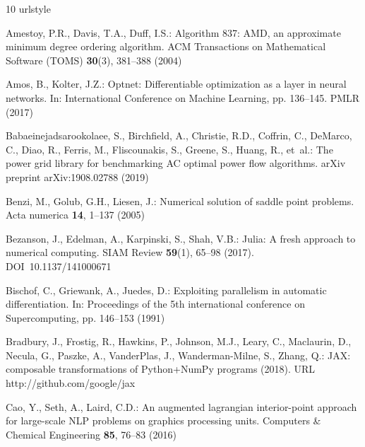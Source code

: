 \documentclass[smallextended]{svjour3}
\begin{document}
\small

\begin{thebibliography}{10}
\providecommand{\url}[1]{{#1}}
\providecommand{\urlprefix}{URL }
\expandafter\ifx\csname urlstyle\endcsname\relax
  \providecommand{\doi}[1]{DOI~\discretionary{}{}{}#1}\else
  \providecommand{\doi}{DOI~\discretionary{}{}{}\begingroup \urlstyle{rm}\Url}\fi

Amestoy, P.R., Davis, T.A., Duff, I.S.: {Algorithm 837: AMD, an approximate minimum degree ordering algorithm}.
\newblock ACM Transactions on Mathematical Software (TOMS) \textbf{30}(3), 381--388 (2004)

Amos, B., Kolter, J.Z.: Optnet: Differentiable optimization as a layer in neural networks.
\newblock In: International Conference on Machine Learning, pp. 136--145. PMLR (2017)

Babaeinejadsarookolaee, S., Birchfield, A., Christie, R.D., Coffrin, C., DeMarco, C., Diao, R., Ferris, M., Fliscounakis, S., Greene, S., Huang, R., et~al.: The power grid library for benchmarking {AC} optimal power flow algorithms.
\newblock arXiv preprint arXiv:1908.02788  (2019)

Benzi, M., Golub, G.H., Liesen, J.: Numerical solution of saddle point problems.
\newblock Acta numerica \textbf{14}, 1--137 (2005)

Bezanson, J., Edelman, A., Karpinski, S., Shah, V.B.: Julia: A fresh approach to numerical computing.
\newblock SIAM Review \textbf{59}(1), 65--98 (2017).
\newblock \doi{10.1137/141000671}

Bischof, C., Griewank, A., Juedes, D.: Exploiting parallelism in automatic differentiation.
\newblock In: Proceedings of the 5th international conference on Supercomputing, pp. 146--153 (1991)

Bradbury, J., Frostig, R., Hawkins, P., Johnson, M.J., Leary, C., Maclaurin, D., Necula, G., Paszke, A., Vander{P}las, J., Wanderman-{M}ilne, S., Zhang, Q.: {JAX}: composable transformations of {P}ython+{N}um{P}y programs (2018).
\newblock \urlprefix\url{http://github.com/google/jax}

Cao, Y., Seth, A., Laird, C.D.: An augmented lagrangian interior-point approach for large-scale {NLP} problems on graphics processing units.
\newblock Computers \& Chemical Engineering \textbf{85}, 76--83 (2016)


\end{thebibliography}
\end{document}

